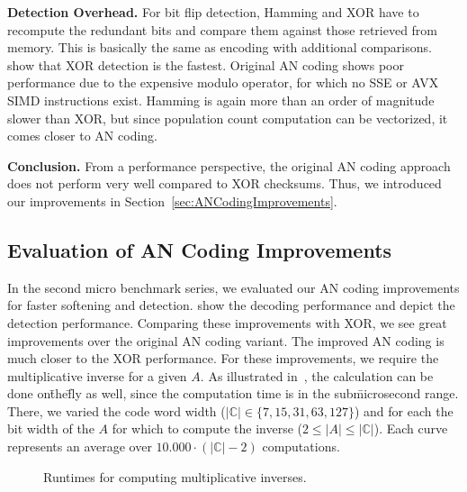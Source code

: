 \textbf{Detection Overhead.}
For bit flip detection, Hamming and XOR have to recompute the redundant bits and compare them against those retrieved from memory. This is basically the same as encoding with additional comparisons.  show that XOR detection is the fastest. Original AN coding shows poor performance due to the expensive modulo operator, for which no SSE or AVX SIMD instructions exist. Hamming is again more than an order of magnitude slower than XOR, but since population count computation can be vectorized, it comes closer to AN coding.

\textbf{Conclusion.} From a performance perspective, the original AN coding approach does not perform very well compared to XOR checksums. Thus, we introduced our improvements in Section~\ref{sec:ANCodingImprovements}.



\subsection{Evaluation of AN Coding Improvements}

In the second micro benchmark series, we evaluated our AN coding improvements for faster softening and detection.  show the decoding performance and  depict the detection performance. Comparing these improvements with XOR, we see great improvements over the original AN coding variant. The improved AN coding is much closer to the XOR performance. For these improvements, we require the multiplicative inverse for a given \(A\). As illustrated in~, the calculation can be done on\=the\=fly as well, since the computation time is in the sub\=microsecond range. There, we varied the code word width (\(|\mathbb{C}|\in\{7, 15,31,63, 127\}\)) and for each the bit width of the \(A\) for which to compute the inverse (\(2\leq|A|\leq|\mathbb{C}|\)). Each curve represents an average over \(10.000 \cdot (|\mathbb{C}|-2)\) computations.

\begin{figure}%
	\centering
	\scriptsize
	\graphicspath{{results/microbenchmarks/ext_euclidean/}}
	\vspace{-3mm}
	\caption{Runtimes for computing multiplicative inverses.}%
	\label{fig:ExtEuclideanSpeed}%
	\vspace{-4mm}
\end{figure}


